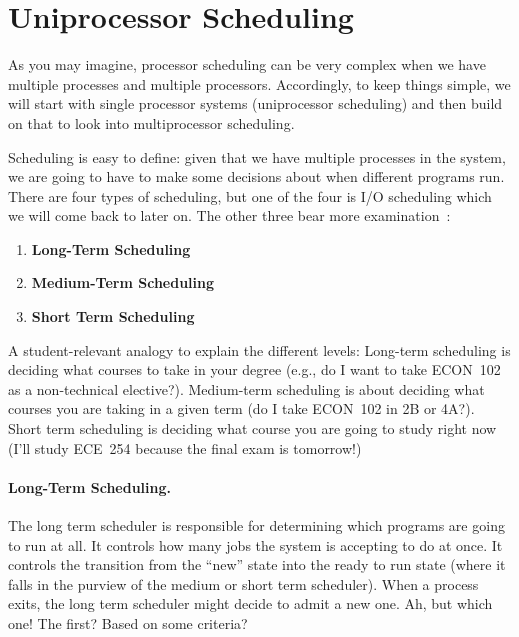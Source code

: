 




\section*{Uniprocessor Scheduling}

As you may imagine, processor scheduling can be very complex when we have multiple processes and multiple processors. Accordingly, to keep things simple, we will start with single processor systems (uniprocessor scheduling) and then build on that to look into multiprocessor scheduling.

Scheduling is easy to define: given that we have multiple processes in the system, we are going to have to make some decisions about when different programs run. There are four types of scheduling, but one of the four is I/O scheduling which we will come back to later on. The other three bear more examination~\cite{osi}:

\begin{enumerate}
	\item \textbf{Long-Term Scheduling}
	\item \textbf{Medium-Term Scheduling}
	\item \textbf{Short Term Scheduling}
\end{enumerate}

A student-relevant analogy to explain the different levels: Long-term scheduling is deciding what courses to take in your degree (e.g., do I want to take ECON~102 as a non-technical elective?). Medium-term scheduling is about deciding what courses you are taking in a given term (do I take ECON~102 in 2B or 4A?). Short term scheduling is deciding what course you are going to study right now (I'll study ECE~254 because the final exam is tomorrow!)

\paragraph{Long-Term Scheduling.}

The long term scheduler is responsible for determining which programs are going to run at all. It controls how many jobs the system is accepting to do at once. It controls the transition from the ``new'' state into the ready to run state (where it falls in the purview of the medium or short term scheduler). When a process exits, the long term scheduler might decide to admit a new one. Ah, but which one! The first? Based on some criteria?

